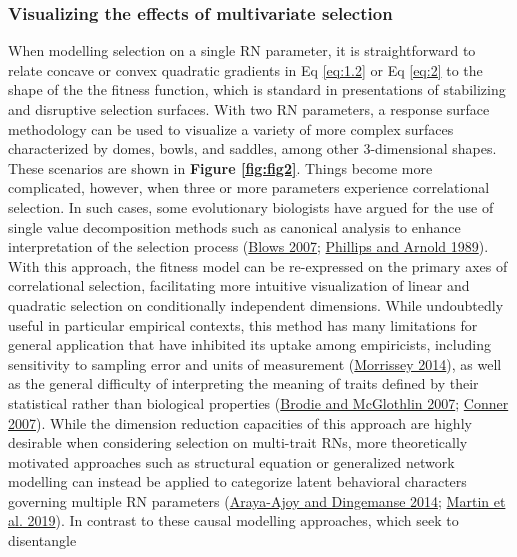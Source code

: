\documentclass{article}
\begin{document}
\hypertarget{visualizing-the-effects-of-multivariate-selection}{%
\subsubsection{Visualizing the effects of multivariate
selection}\label{visualizing-the-effects-of-multivariate-selection}}

When modelling selection on a single RN parameter, it is straightforward
to relate concave or convex quadratic gradients in Eq \ref{eq:1.2} or Eq
\ref{eq:2} to the shape of the the fitness function, which is standard
in presentations of stabilizing and disruptive selection surfaces. With
two RN parameters, a response surface methodology can be used to
visualize a variety of more complex surfaces characterized by domes,
bowls, and saddles, among other 3-dimensional shapes. These scenarios
are shown in \textbf{Figure \ref{fig:fig2}}. Things become more
complicated, however, when three or more parameters experience
correlational selection. In such cases, some evolutionary biologists
have argued for the use of single value decomposition methods such as
canonical analysis to enhance interpretation of the selection process
(\protect\hyperlink{ref-Blows2007}{Blows 2007};
\protect\hyperlink{ref-Phillips1989}{Phillips and Arnold 1989}). With
this approach, the fitness model can be re-expressed on the primary axes
of correlational selection, facilitating more intuitive visualization of
linear and quadratic selection on conditionally independent dimensions.
While undoubtedly useful in particular empirical contexts, this method
has many limitations for general application that have inhibited its
uptake among empiricists, including sensitivity to sampling error and
units of measurement (\protect\hyperlink{ref-Morrissey2014}{Morrissey
2014}), as well as the general difficulty of interpreting the meaning of
traits defined by their statistical rather than biological properties
(\protect\hyperlink{ref-Brodie2007}{Brodie and McGlothlin 2007};
\protect\hyperlink{ref-Conner2007}{Conner 2007}). While the dimension
reduction capacities of this approach are highly desirable when
considering selection on multi-trait RNs, more theoretically motivated
approaches such as structural equation or generalized network modelling
can instead be applied to categorize latent behavioral characters
governing multiple RN parameters
(\protect\hyperlink{ref-Araya2014}{Araya-Ajoy and Dingemanse 2014};
\protect\hyperlink{ref-Martin2019}{Martin et al. 2019}). In contrast to
these causal modelling approaches, which seek to disentangle
\end{document}
